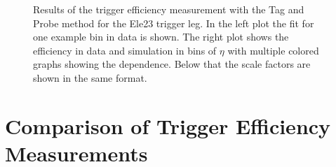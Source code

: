 \begin{figure}[htbp!]
  \begin{center}
      \caption{Results of the trigger efficiency measurement with the Tag and Probe method for the Ele23 trigger leg. In the left plot the fit for one example bin in data is shown. The right plot shows the efficiency in data and simulation in bins of $\eta$ with multiple colored graphs showing the \pt dependence. Below that the scale factors are shown in the same format. }  
    \label{fig:TP_Ele23}
  \end{center}
\end{figure}




\section{Comparison of Trigger Efficiency Measurements}
\label{sec:TriggerComp}

